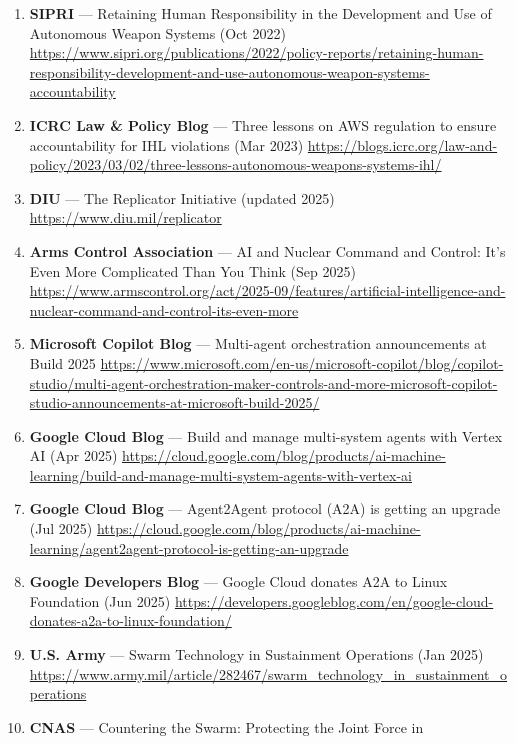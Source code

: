 \documentclass[
]{article}
\begin{document}
\begin{enumerate}
  (including UNGA resolution 79/239 context)
  \url{https://disarmament.unoda.org/en/our-work/emerging-challenges/artificial-intelligence-military-domain}
\item
  \textbf{SIPRI} --- Retaining Human Responsibility in the Development
  and Use of Autonomous Weapon Systems (Oct 2022)
  \url{https://www.sipri.org/publications/2022/policy-reports/retaining-human-responsibility-development-and-use-autonomous-weapon-systems-accountability}
\item
  \textbf{ICRC Law \& Policy Blog} --- Three lessons on AWS regulation
  to ensure accountability for IHL violations (Mar 2023)
  \url{https://blogs.icrc.org/law-and-policy/2023/03/02/three-lessons-autonomous-weapons-systems-ihl/}
\item
  \textbf{DIU} --- The Replicator Initiative (updated 2025)
  \url{https://www.diu.mil/replicator}
\item
  \textbf{Arms Control Association} --- AI and Nuclear Command and
  Control: It's Even More Complicated Than You Think (Sep 2025)
  \url{https://www.armscontrol.org/act/2025-09/features/artificial-intelligence-and-nuclear-command-and-control-its-even-more}
\item
  \textbf{Microsoft Copilot Blog} --- Multi-agent orchestration
  announcements at Build 2025
  \url{https://www.microsoft.com/en-us/microsoft-copilot/blog/copilot-studio/multi-agent-orchestration-maker-controls-and-more-microsoft-copilot-studio-announcements-at-microsoft-build-2025/}
\item
  \textbf{Google Cloud Blog} --- Build and manage multi-system agents
  with Vertex AI (Apr 2025)
  \url{https://cloud.google.com/blog/products/ai-machine-learning/build-and-manage-multi-system-agents-with-vertex-ai}
\item
  \textbf{Google Cloud Blog} --- Agent2Agent protocol (A2A) is getting
  an upgrade (Jul 2025)
  \url{https://cloud.google.com/blog/products/ai-machine-learning/agent2agent-protocol-is-getting-an-upgrade}
\item
  \textbf{Google Developers Blog} --- Google Cloud donates A2A to Linux
  Foundation (Jun 2025)
  \url{https://developers.googleblog.com/en/google-cloud-donates-a2a-to-linux-foundation/}
\item
  \textbf{U.S. Army} --- Swarm Technology in Sustainment Operations (Jan
  2025)
  \url{https://www.army.mil/article/282467/swarm_technology_in_sustainment_operations}
\item
  \textbf{CNAS} --- Countering the Swarm: Protecting the Joint Force in

\end{enumerate}
\end{document}
